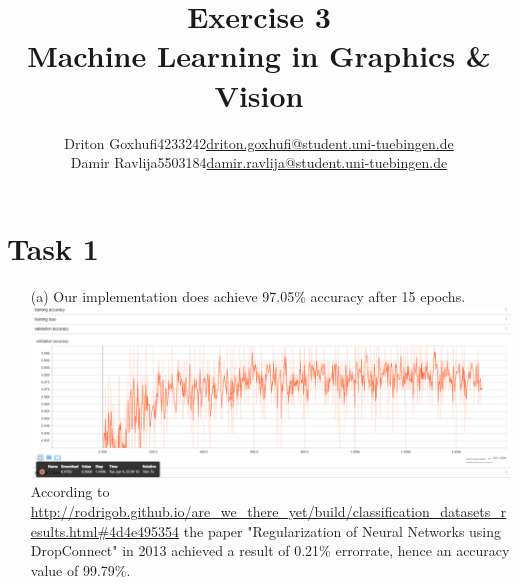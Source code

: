 \documentclass [a4paper, 11pt] {article}
\makeatletter
\newcommand{\courseName}{Machine Learning in Graphics \& Vision}
\newcommand{\homeworkNum}{3}
\newcommand{\studentOne}{Driton Goxhufi}
\newcommand{\studentTwo} {Damir Ravlija}
\newcommand{\matrikelNrStOne}{4233242}
\newcommand{\matrikelNrStTwo}{5503184}
\newcommand{\mailStOne}{driton.goxhufi@student.uni-tuebingen.de}
\newcommand{\mailStTwo}{damir.ravlija@student.uni-tuebingen.de}
\makeatother
\begin{document}
	
\title{\vspace{-1.5cm}\textbf{Exercise \homeworkNum} \\ 
	\courseName}
\author{\begin{tabular}{lcr}
		\studentOne & \matrikelNrStOne & \href{mailto:\mailStOne}{\mailStOne} \\
		\studentTwo & \matrikelNrStTwo & \href{mailto:\mailStTwo}{\mailStTwo} 
\end{tabular}}	
\date{}
\maketitle


\section{Task 1}
\begin{enumerate}
\item[(a)]
Our implementation does achieve 97.05\% accuracy after 15 epochs.\\
\includegraphics{img/validation_acc_15epochs.png}\\
According to \url{http://rodrigob.github.io/are_we_there_yet/build/classification_datasets_results.html#4d4e495354} the paper "Regularization of Neural Networks using DropConnect" in 2013 achieved a result of 0.21\% errorrate, hence an accuracy value of 99.79\%.


\end{enumerate}
\end{document}
